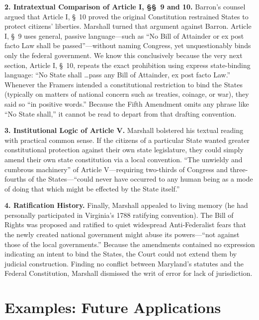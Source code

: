 \documentclass[12pt]{article}
\begin{document}
\textbf{2. Intratextual Comparison of Article I, \S\S~9 and 10.} Barron's counsel argued that Article I, \S~10 proved the original Constitution restrained States to protect citizens' liberties. Marshall turned that argument against Barron. Article I, \S~9 uses general, passive language---such as ``No Bill of Attainder or ex post facto Law shall be passed''---without naming Congress, yet unquestionably binds only the federal government. We know this conclusively because the very next section, Article I, \S~10, repeats the exact prohibition using express state-binding language: ``No State shall \dots pass any Bill of Attainder, ex post facto Law.'' Whenever the Framers intended a constitutional restriction to bind the States (typically on matters of national concern such as treaties, coinage, or war), they said so ``in positive words.'' Because the Fifth Amendment omits any phrase like ``No State shall,'' it cannot be read to depart from that drafting convention.

\textbf{3. Institutional Logic of Article V.} Marshall bolstered his textual reading with practical common sense. If the citizens of a particular State wanted greater constitutional protection against their own state legislature, they could simply amend their own state constitution via a local convention. ``The unwieldy and cumbrous machinery'' of Article V---requiring two-thirds of Congress and three-fourths of the States---``could never have occurred to any human being as a mode of doing that which might be effected by the State itself.''

\textbf{4. Ratification History.} Finally, Marshall appealed to living memory (he had personally participated in Virginia's 1788 ratifying convention). The Bill of Rights was proposed and ratified to quiet widespread Anti-Federalist fears that the newly created national government might abuse its powers---``not against those of the local governments.'' Because the amendments contained no expression indicating an intent to bind the States, the Court could not extend them by judicial construction. Finding no conflict between Maryland's statutes and the Federal Constitution, Marshall dismissed the writ of error for lack of jurisdiction.

\section{Examples: Future Applications}
\end{document}
